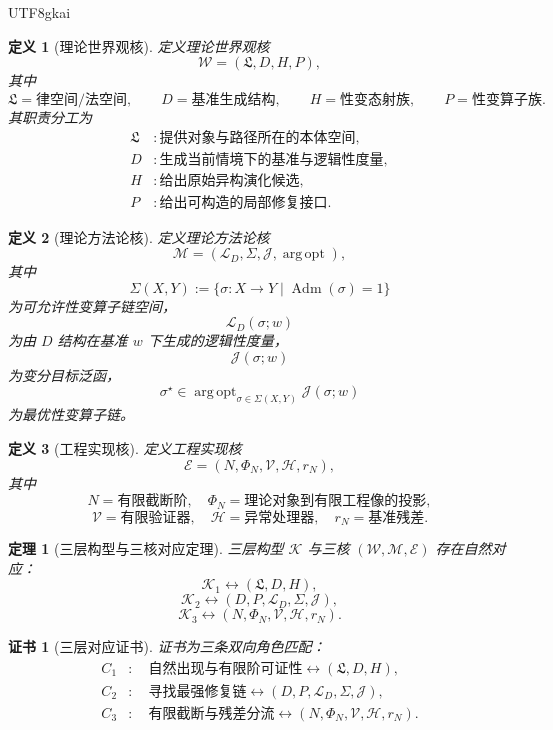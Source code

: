 \documentclass[12pt]{article}
\newtheorem{definition}{定义}[section]
\newtheorem{theorem}{定理}[section]
\newtheorem{Certificate}{证书}[section]
\newcommand{\Law}{\mathfrak{L}}
\newcommand{\Adm}{\operatorname{Adm}}
\DeclareMathOperator*{\argopt}{arg\,opt}
\begin{document}
\begin{CJK*}{UTF8}{gkai}
\begin{definition}[理论世界观核]
定义理论世界观核
\[
  \mathcal W=(\Law,D,H,P),
\]
其中
\[
  \Law=\text{律空间/法空间},\qquad
  D=\text{基准生成结构},\qquad
  H=\text{性变态射族},\qquad
  P=\text{性变算子族}.
\]
其职责分工为
\[
\begin{aligned}
  \Law&:\text{提供对象与路径所在的本体空间},\\
  D&:\text{生成当前情境下的基准与逻辑性度量},\\
  H&:\text{给出原始异构演化候选},\\
  P&:\text{给出可构造的局部修复接口}.
\end{aligned}
\]
\end{definition}

\begin{definition}[理论方法论核]
定义理论方法论核
\[
  \mathcal M=(\mathcal L_D,\Sigma,\mathcal J,\argopt),
\]
其中
\[
  \Sigma(X,Y)
  :=
  \{\sigma:X\to Y\mid \Adm(\sigma)=1\}
\]
为可允许性变算子链空间，
\[
  \mathcal L_D(\sigma;w)
\]
为由 $D$ 结构在基准 $w$ 下生成的逻辑性度量，
\[
  \mathcal J(\sigma;w)
\]
为变分目标泛函，
\[
  \sigma^\star\in
  \argopt_{\sigma\in\Sigma(X,Y)}\mathcal J(\sigma;w)
\]
为最优性变算子链。
\end{definition}

\begin{definition}[工程实现核]
定义工程实现核
\[
  \mathcal E=(N,\Phi_N,\mathcal V,\mathcal H,r_N),
\]
其中
\[
  N=\text{有限截断阶},\quad
  \Phi_N=\text{理论对象到有限工程像的投影},
\]
\[
  \mathcal V=\text{有限验证器},\quad
  \mathcal H=\text{异常处理器},\quad
  r_N=\text{基准残差}.
\]
\end{definition}

\begin{theorem}[三层构型与三核对应定理]
\label{thm:tex50-three-kernel-correspondence}
三层构型 $\mathcal K$ 与三核 $(\mathcal W,\mathcal M,\mathcal E)$ 存在自然对应：
\[
  \mathcal K_1\leftrightarrow(\Law,D,H),
\]
\[
  \mathcal K_2\leftrightarrow(D,P,\mathcal L_D,\Sigma,\mathcal J),
\]
\[
  \mathcal K_3\leftrightarrow(N,\Phi_N,\mathcal V,\mathcal H,r_N).
\]
\end{theorem}

\begin{Certificate}[三层对应证书]
证书为三条双向角色匹配：
\[
\begin{aligned}
  C_1&:\quad
  \text{自然出现与有限阶可证性}
  \leftrightarrow
  (\Law,D,H),\\
  C_2&:\quad
  \text{寻找最强修复链}
  \leftrightarrow
  (D,P,\mathcal L_D,\Sigma,\mathcal J),\\
  C_3&:\quad
  \text{有限截断与残差分流}
  \leftrightarrow
  (N,\Phi_N,\mathcal V,\mathcal H,r_N).
\end{aligned}
\]
\end{Certificate}


\end{CJK*}
\end{document}
